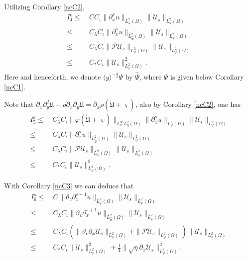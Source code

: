 \documentclass{amsart}
\numberwithin{equation}{section}
\newcommand\y{{{\langle y \rangle}}}
\begin{document}
 Utilizing Corollary \ref{ncC2},
\begin{align*}
I_{4}^{o}
\leq&~CC_{\iota}\|\partial_{x}^{s}u\|_{L_{\varphi}^{2}(\Omega)}\|\mathcal{U}_{s}\|_{L_{\varphi}^{2}(\Omega)}\\
\leq&~C_{\lambda}C_{\iota}\|\partial_{x}^{s}u\|_{L_{\hat{\Psi}}^{2}(\Omega)}\|\mathcal{U}_{s}\|_{L_{\varphi}^{2}(\Omega)}\\
\leq&~C_{\lambda}C_{\iota}\|\mathcal{P}\mathcal{U}_{s}\|_{L_{\varphi}^{2}(\Omega)}\|\mathcal{U}_{s}\|_{L_{\varphi}^{2}(\Omega)}\\
\leq&~C_{*}C_{\iota}\|\mathcal{U}_{s}\|_{L_{\varphi}^{2}(\Omega)}^{2}.
\end{align*}
Here and henceforth, we denote $\y^{-\frac{1}{2}}\Psi$ by $\hat{\Psi}$, where $\Psi$ is given below Corollary \ref{ncC1}.

 Note that $\partial_{x}\partial_{y}^{2}\mathfrak{U}-\rho\partial_{x}\partial_{y}\mathfrak{U}=\partial_{x}\rho(\dot{\mathfrak{U}}+\varsigma)$, also by Corollary \ref{ncC2}, one has
\begin{align*}
I_{5}^{o}
\leq&~C_{\lambda}C_{\iota}\|\varphi(\dot{\mathfrak{U}}+\varsigma)\|_{L_{x}^{\infty}L_{y}^{2}(\Omega)}
       \|\partial_{x}^{s}u\|_{L_{\varphi}^{2}(\Omega)}\|\mathcal{U}_{s}\|_{L_{\varphi}^{2}(\Omega)}\\
\leq&~C_{\lambda}C_{\iota}\|\partial_{x}^{s}u\|_{L_{\hat{\Psi}}^{2}(\Omega)}\|\mathcal{U}_{s}\|_{L_{\varphi}^{2}(\Omega)}\\
\leq&~C_{\lambda}C_{\iota}\|\mathcal{P}\mathcal{U}_{s}\|_{L_{\varphi}^{2}(\Omega)}\|\mathcal{U}_{s}\|_{L_{\varphi}^{2}(\Omega)}\\
\leq&~C_{*}C_{\iota}\|\mathcal{U}_{s}\|_{L_{\varphi}^{2}(\Omega)}^{2}.
\end{align*}

 With Corollary \ref{ncC3} we can deduce that
\begin{align*}
I_{6}^{o}
\leq&~C\|\vartheta_{c}\partial_{x}^{s+1}u\|_{L_{\varphi}^{2}(\Omega)}\|\mathcal{U}_{s}\|_{L_{\varphi}^{2}(\Omega)}\\
\leq&~C_{\lambda}C_{\iota}\|\vartheta_{c}\partial_{x}^{s+1}u\|_{L_{\hat{\Psi}}^{2}(\Omega)}\|\mathcal{U}_{s}\|_{L_{\varphi}^{2}(\Omega)}\\
\leq&~C_{\lambda}C_{\iota}\left(\|\vartheta_{c}\partial_{x}\mathcal{U}_{s}\|_{L_{\varphi}^{2}(\Omega)}+\|\mathcal{P}\mathcal{U}_{s}\|_{L_{\varphi}^{2}(\Omega)}\right)
                 \|\mathcal{U}_{s}\|_{L_{\varphi}^{2}(\Omega)}\\
\leq&~C_{*}C_{\iota}\|\mathcal{U}_{s}\|_{L_{\varphi}^{2}(\Omega)}^{2}+\frac{1}{4}\|\sqrt{\eta}\partial_{x}\mathcal{U}_{s}\|_{L_{\varphi}^{2}(\Omega)}^{2}.
\end{align*}
\end{document}
